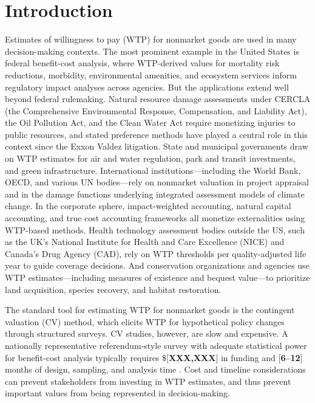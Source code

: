 \documentclass[12pt]{article}
\begin{document}
\section{Introduction}\label{sec:intro}

Estimates of willingness to pay (WTP) for nonmarket goods are used in many decision-making contexts. The most prominent example in the United States is federal benefit-cost analysis, where WTP-derived values for mortality risk reductions, morbidity, environmental amenities, and ecosystem services inform regulatory impact analyses across agencies. But the applications extend well beyond federal rulemaking. Natural resource damage assessments under CERCLA (the Comprehensive Environmental Response, Compensation, and Liability Act), the Oil Pollution Act, and the Clean Water Act require monetizing injuries to public resources, and stated preference methods have played a central role in this context since the Exxon Valdez litigation. State and municipal governments draw on WTP estimates for air and water regulation, park and transit investments, and green infrastructure. International institutions—including the World Bank, OECD, and various UN bodies—rely on nonmarket valuation in project appraisal and in the damage functions underlying integrated assessment models of climate change. In the corporate sphere, impact-weighted accounting, natural capital accounting, and true cost accounting frameworks all monetize externalities using WTP-based methods. Health technology assessment bodies outside the US, such as the UK's National Institute for Health and Care Excellence (NICE) and Canada's Drug Agency (CAD), rely on WTP thresholds per quality-adjusted life year to guide coverage decisions. And conservation organizations and agencies use WTP estimates—including measures of existence and bequest value—to prioritize land acquisition, species recovery, and habitat restoration. 

The standard tool for estimating WTP for nonmarket goods is the contingent valuation (CV) method, which elicits WTP for hypothetical policy changes through structured surveys. CV studies, however, are slow and expensive. A nationally representative referendum-style survey with adequate statistical power for benefit-cost analysis typically requires \$[\textbf{XXX,XXX}] in funding and [\textbf{6--12}] months of design, sampling, and analysis time \parencite{Johnston2017, Champ2017}. Cost and timeline considerations can prevent stakeholders from investing in WTP estimates, and thus prevent important values from being represented in decision-making.
\end{document}
